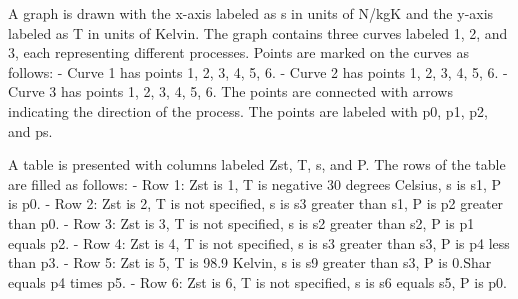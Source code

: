 A graph is drawn with the x-axis labeled as s in units of N/kgK and the y-axis labeled as T in units of Kelvin. The graph contains three curves labeled 1, 2, and 3, each representing different processes. Points are marked on the curves as follows:
- Curve 1 has points 1, 2, 3, 4, 5, 6.
- Curve 2 has points 1, 2, 3, 4, 5, 6.
- Curve 3 has points 1, 2, 3, 4, 5, 6.
The points are connected with arrows indicating the direction of the process. The points are labeled with p0, p1, p2, and ps.

A table is presented with columns labeled Zst, T, s, and P. The rows of the table are filled as follows:
- Row 1: Zst is 1, T is negative 30 degrees Celsius, s is s1, P is p0.
- Row 2: Zst is 2, T is not specified, s is s3 greater than s1, P is p2 greater than p0.
- Row 3: Zst is 3, T is not specified, s is s2 greater than s2, P is p1 equals p2.
- Row 4: Zst is 4, T is not specified, s is s3 greater than s3, P is p4 less than p3.
- Row 5: Zst is 5, T is 98.9 Kelvin, s is s9 greater than s3, P is 0.Shar equals p4 times p5.
- Row 6: Zst is 6, T is not specified, s is s6 equals s5, P is p0.